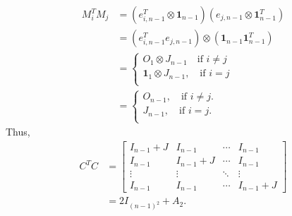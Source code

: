 \begin{itemize}
    \begin{align*}
        M_{i}^TM_{j} &= (e_{i,n-1}^T \otimes \mathbf{1}_{n-1})(e_{j,n-1} \otimes \mathbf{1}_{n-1}^T) \\
        &= (e_{i,n-1}^Te_{j,n-1})\otimes (\mathbf{1}_{n-1}\mathbf{1}_{n-1}^T) \\
        &= \begin{cases}
            O_1 \otimes J_{n-1} \quad\text{if }i\neq j \\
            \mathbf{1}_1 \otimes J_{n-1}, \quad\text{if }i= j \\
        \end{cases}\\
        &= \begin{cases}
        O_{n-1}, \quad\text{if }i\neq j. \\
        J_{n-1}, \quad\text{if }i= j. \\
        \end{cases}
    \end{align*}
    Thus,
    \begin{align*}
        C^TC &=
        \begin{bmatrix}
            I_{n-1} + J & I_{n-1} & \cdots & I_{n-1} \\
            I_{n-1} & I_{n-1} + J & \cdots & I_{n-1} \\
            \vdots & \vdots & \ddots & \vdots \\
            I_{n-1} & I_{n-1} & \cdots & I_{n-1} + J
        \end{bmatrix} \\
        &=
        2I_{(n-1)^2} + A_2.
    \end{align*}
    

\end{itemize}
